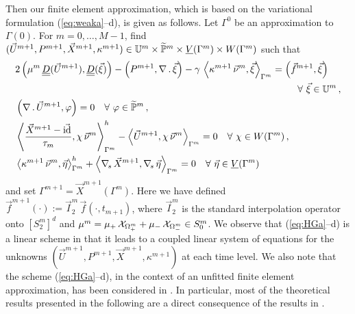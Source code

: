 Then our finite element approximation, which is based on the variational
formulation (\ref{eq:weaka}--d), is given as follows. Let $\Gamma^0$ be an
approximation to $\Gamma(0)$. For $m=0,\ldots, M-1$, find $(\vec U^{m+1},
P^{m+1}, \vec{X}^{m+1}, \kappa^{m+1}) \in \mathbb{U}^m\times \widetilde{\mathbb{P}}^m
\times \underline{V}(\Gamma^m) \times W(\Gamma^m)$ such that
\begin{subequations}
\begin{align}
& 2\left(\mu^m\,\mat D(\vec U^{m+1}), \mat D(\vec \xi) \right)
- \left(P^{m+1}, \nabla\,.\,\vec \xi\right) - \gamma\,\left\langle
\kappa^{m+1}\,\vec\nu^m, \vec\xi\right\rangle_{\Gamma^m}= \left(\vec f^{m+1},
\vec \xi\right) \nonumber \\
& \hspace{10cm} \quad \forall\ \vec\xi \in \uspace^m \,,\label{eq:HGa}\\
& \left(\nabla\,.\,\vec U^{m+1}, \varphi\right)  = 0
\quad \forall\ \varphi \in \pnormspace^m\,,\label{eq:HGb} \\
&  \left\langle \frac{\vec X^{m+1} - \vec\id}{\tau_m} ,\chi\,\vec\nu^m
\right\rangle_{\Gamma^m}^h - \left\langle \vec U^{m+1}, \chi\,\vec\nu^m
\right\rangle_{\Gamma^m}  = 0 \quad \forall\ \chi \in \Wh\,, \label{eq:HGc} \\
& \left\langle \kappa^{m+1}\,\vec\nu^m, \vec\eta \right\rangle_{\Gamma^m}^h
+ \left\langle \nabs\,\vec X^{m+1}, \nabs\,\vec \eta \right\rangle_{\Gamma^m} =
0 \quad \forall\ \vec\eta \in \Vh \label{eq:HGd}
\end{align}
\end{subequations}
and set $\Gamma^{m+1} = \vec{X}^{m+1}(\Gamma^m)$. Here we have defined
$\vec f^{m+1}(\cdot) := \vec I^m_2\,\vec f(\cdot,t_{m+1})$, where $\vec I^m_2$
is the standard interpolation operator onto $[S^m_2]^d$ and $\mu^m =
\mu_+\,\mathrm{\mathcal{X}}_{\Omega^m_+} + \mu_-\,\mathrm{\mathcal{X}}_{\Omega^m_-}\in S^m_0$.
We observe that (\ref{eq:HGa}--d) is a linear scheme in that it leads to a
coupled linear system of equations for the unknowns
$(\vec U^{m+1}, P^{m+1}, \vec{X}^{m+1}, \kappa^{m+1})$ at each time level.
We also note that the scheme (\ref{eq:HGa}--d), in the context of an
unfitted finite element approximation, has been considered in \cite{spurious}.
In particular, most of the theoretical results presented in the following
are a direct consequence of the results in \cite{spurious}.

